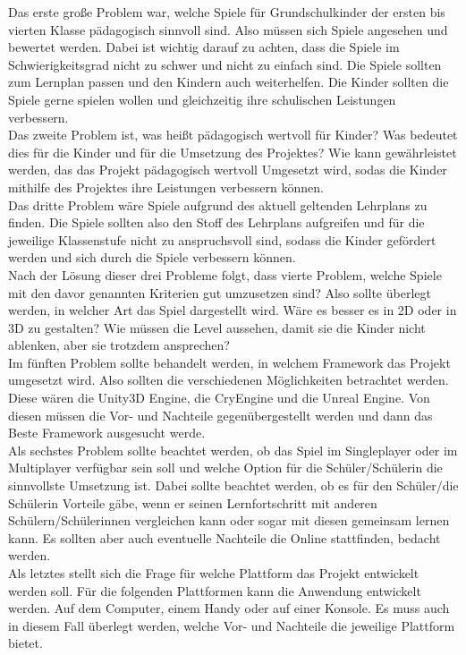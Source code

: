 
Das erste große Problem war, welche Spiele für Grundschulkinder der ersten bis vierten Klasse pädagogisch sinnvoll sind. Also müssen sich Spiele angesehen und bewertet werden. Dabei ist wichtig darauf zu achten, dass die Spiele im Schwierigkeitsgrad nicht zu schwer und nicht zu einfach sind. Die Spiele sollten zum Lernplan passen und den Kindern auch weiterhelfen. Die Kinder sollten die Spiele gerne spielen wollen und gleichzeitig ihre schulischen Leistungen verbessern.
\\

Das zweite Problem ist, was heißt pädagogisch wertvoll für Kinder? Was bedeutet dies für die Kinder und für die Umsetzung des Projektes? Wie kann gewährleistet werden, das das Projekt pädagogisch wertvoll Umgesetzt wird, sodas die Kinder mithilfe des Projektes ihre Leistungen verbessern können.
\\

Das dritte Problem wäre Spiele aufgrund des aktuell geltenden Lehrplans zu finden. Die Spiele sollten also den Stoff des Lehrplans aufgreifen und für die jeweilige Klassenstufe nicht zu anspruchsvoll sind, sodass die Kinder gefördert werden und sich durch die Spiele verbessern können.
\\

Nach der Lösung dieser drei Probleme folgt, dass vierte Problem, welche Spiele mit den davor genannten Kriterien gut umzusetzen sind? Also sollte überlegt werden, in welcher Art das Spiel dargestellt wird. Wäre es besser es in 2D oder in 3D zu gestalten? Wie müssen die Level aussehen, damit sie die Kinder nicht ablenken, aber sie trotzdem ansprechen?
\\

Im fünften Problem sollte behandelt werden, in welchem Framework das Projekt umgesetzt wird. Also sollten die verschiedenen Möglichkeiten betrachtet werden. Diese wären die Unity3D Engine, die CryEngine und die Unreal Engine. Von diesen müssen die Vor- und Nachteile gegenübergestellt werden und dann das Beste Framework ausgesucht werde.
\\

Als sechstes Problem sollte beachtet werden, ob das Spiel im Singleplayer oder im Multiplayer verfügbar sein soll und welche Option für die Schüler/Schülerin die sinnvollste Umsetzung ist. Dabei sollte beachtet werden, ob es für den Schüler/die Schülerin Vorteile gäbe, wenn er seinen Lernfortschritt mit anderen Schülern/Schülerinnen vergleichen kann oder sogar mit diesen gemeinsam lernen kann. Es sollten aber auch eventuelle Nachteile die Online stattfinden, bedacht werden.
\\
Als letztes stellt sich die Frage für welche Plattform das Projekt entwickelt werden soll. Für die folgenden Plattformen kann die Anwendung entwickelt werden. Auf dem Computer, einem Handy oder auf einer Konsole. Es muss auch in diesem Fall überlegt werden, welche Vor- und Nachteile die jeweilige Plattform bietet.

